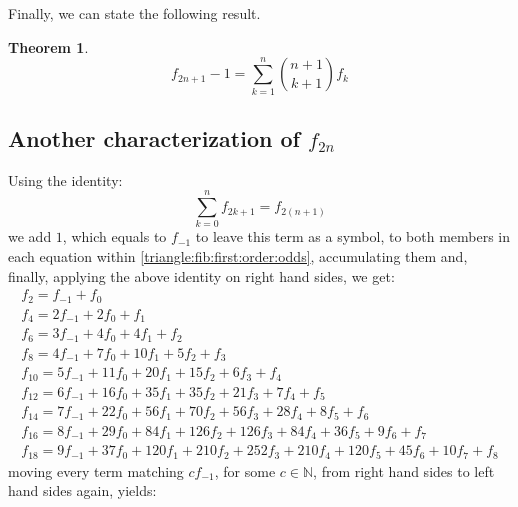 \documentclass[a4paper,dottedtoc,headinclude,footinclude]{report} %
\theoremstyle{plain}
\newtheorem{thm}{Theorem}[section]
\begin{document}
    Finally, we can state the following result.
    \begin{thm}
        \begin{displaymath}
            f_{2n+1} - 1 = \sum_{k=1}^{n}{{{n+1}\choose{k+1}}f_{k}}
        \end{displaymath}
    \end{thm}
    
    \subsection{Another characterization of $f_{2n}$}
    Using the identity:
    \begin{displaymath}
        \sum_{k=0}^{n} f_{2 k + 1} = f_{2 (n+1)}
    \end{displaymath}
    we add $1$, which equals to $f_{-1}$ to leave this term
    as a symbol, to both members in each equation within 
    \autoref{triangle:fib:first:order:odds}, accumulating them
    and, finally, applying the above identity on right hand sides, we get:
    \begin{equation}
        \begin{array}{c}
            f_{2} = f_{-1} + f_{0}\\
            f_{4} =2 f_{-1} + 2 f_{0} + f_{1}\\
            f_{6} =3 f_{-1} + 4 f_{0} + 4 f_{1} + f_{2}\\
            f_{8} =4 f_{-1} + 7 f_{0} + 10 f_{1} + 5 f_{2} + f_{3}\\
            f_{10} =5 f_{-1} + 11 f_{0} + 20 f_{1} + 15 f_{2} + 6 f_{3} + f_{4}\\
            f_{12} =6 f_{-1} + 16 f_{0} + 35 f_{1} + 35 f_{2} + 21 f_{3} + 7 f_{4} + f_{5}\\
            f_{14} =7 f_{-1} + 22 f_{0} + 56 f_{1} + 70 f_{2} + 56 f_{3} + 28 f_{4} + 8 f_{5} + f_{6}\\
            f_{16} =8 f_{-1} + 29 f_{0} + 84 f_{1} + 126 f_{2} + 126 f_{3} + 84 f_{4} + 36 f_{5} + 9 f_{6} + f_{7}\\
            f_{18} =9 f_{-1} + 37 f_{0} + 120 f_{1} + 210 f_{2} + 252 f_{3} + 210 f_{4} + 120 f_{5} + 45 f_{6} + 10 f_{7} + f_{8}
        \end{array}
        \label{eq:tringle:even:subscripted:fibs:sym}
    \end{equation}
    moving every term matching $c f_{-1}$, for some $c\in\mathbb{N}$, from right hand sides to
    left hand sides again, yields:
\end{document}
